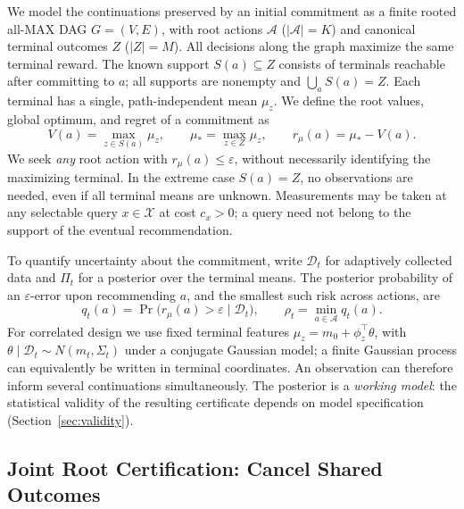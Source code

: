 \documentclass{article}
\theoremstyle{plain}
\theoremstyle{definition}
\begin{document}
We model the continuations preserved by an initial commitment
as a finite rooted all-MAX DAG $G=(V,E)$, with root actions
$\mathcal A$ ($|\mathcal A|=K$) and canonical terminal outcomes
$Z$ ($|Z|=M$). All decisions along the graph maximize the same
terminal reward. The known support $S(a)\subseteq Z$ consists
of terminals reachable after committing to $a$; all supports
are nonempty and $\bigcup_aS(a)=Z$. Each terminal has a single,
path-independent mean $\mu_z$. We define the root values,
global optimum, and regret of a commitment as
\begin{equation}
  V(a)=\max_{z\in S(a)}\mu_z,\qquad
  \mu_*=\max_{z\in Z}\mu_z,\qquad
  r_\mu(a)=\mu_*-V(a).
  \label{eq:true-value}
\end{equation}
We seek \emph{any} root action with $r_\mu(a)\le\varepsilon$,
without necessarily identifying the maximizing terminal.
In the extreme case $S(a)=Z$, no observations are needed,
even if all terminal means are unknown. Measurements may
be taken at any selectable query $x\in\mathcal X$ at cost
$c_x>0$; a query need not belong to the support of the
eventual recommendation.

To quantify uncertainty about the commitment, write
$\mathcal D_t$ for adaptively collected data and $\Pi_t$
for a posterior over the terminal means. The posterior
probability of an $\varepsilon$-error upon recommending $a$,
and the smallest such risk across actions, are
\begin{equation}
 q_t(a)=\Pr\bigl(r_\mu(a)>\varepsilon\mid\mathcal D_t\bigr),
 \qquad \rho_t=\min_{a\in\mathcal A}q_t(a).
 \label{eq:main-posterior-risk}
\end{equation}
For correlated design we use fixed terminal features
$\mu_z=m_0+\phi_z^\top\theta$, with
$\theta\mid\mathcal D_t\sim N(m_t,\Sigma_t)$ under a conjugate
Gaussian model; a finite Gaussian process can equivalently
be written in terminal coordinates. An observation can
therefore inform several continuations simultaneously.
The posterior is a \emph{working model}: the statistical
validity of the resulting certificate depends on model
specification (Section~\ref{sec:validity}).


\subsection{Joint Root Certification: Cancel Shared Outcomes}
\label{sec:joint-certification}
\end{document}
